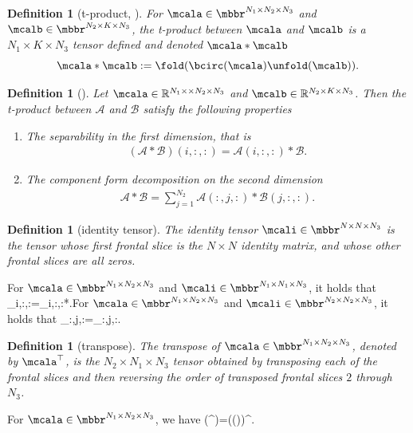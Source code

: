 \documentclass[11pt]{article}
\newtheorem{definition}[theorem]{Definition}
\def\fm#1{\mathcal{#1}}
\def\r{\mathbb{R}}
\begin{document}
\begin{definition}[t-product, \cite{bai2019partially}]
For $\mcala\in\mbbr^{N_1\times N_2\times N_3}$ and $\mcalb\in\mbbr^{N_2\times K\times N_3}$, the {\it t-product} between $\mcala$ and $\mcalb $ is  a $ N_1\times K\times N_3$ tensor  defined and denoted  $\mcala*\mcalb$ 
$$
\mcala*\mcalb:=\fold(\bcirc(\mcala)\unfold(\mcalb)).
$$	
\end{definition}

\begin{definition}[\cite{an2024randomized}]
Let $\mcala \in \r^{N_1\times \times N_2 \times N_3}$ and $\mcalb \in \r^{N_2\times K\times N_3}$. Then the t-product between $\fm A $ and $\fm B$ satisfy the following properties
\begin{enumerate}
    \item The separability in the first dimension, that is 
    \begin{align*}
        \left( \fm A * \fm B\right)(i, :, :) = \fm A(i, :, :) * \fm B.
    \end{align*}
    \item  The component form decomposition on the second dimension
    \begin{align}
        \fm A * \fm B = \sum_{j=1}^{N_2} \fm A(:, j, :) * \fm B (j, :, :).
    \end{align}
\end{enumerate}
\end{definition}

\begin{definition}[identity tensor]
 The identity tensor $\mcali\in\mbbr^{N\times N\times N_3}$ is the tensor whose first frontal slice is the $N\times N$ identity matrix, and whose other frontal slices are all zeros.	
\end{definition}
For $\mcala\in\mbbr^{N_1\times N_2\times N_3}$ and $\mcali\in\mbbr^{N_1\times N_1\times N_3}$, it holds that \beq\label{ii}\mcala_{i,:,:}=\mcali_{i,:,:}*\mcala.\eeq For $\mcala\in\mbbr^{N_1\times N_2\times N_3}$ and $\mcali\in\mbbr^{N_2\times N_2\times N_3}$, it holds that \beq\label{ij}\mcala_{:,j,:}=\mcala*\mcali_{:,j,:}.\eeq

\begin{definition}[transpose]
The transpose of $\mcala\in\mbbr^{N_1\times N_2\times N_3}$, denoted by $\mcala^\top$, is the $N_2\times N_1\times N_3$ tensor obtained by transposing each of the frontal slices and then reversing the order of transposed frontal slices $2$ through $N_3$.
\end{definition} 
For $\mcala\in\mbbr^{N_1\times N_2\times N_3}$, we have  \beq\label{ttop}\bcirc(\mcala^\top)=(\bcirc(\mcala))^\top.\eeq %
   
\end{document}
